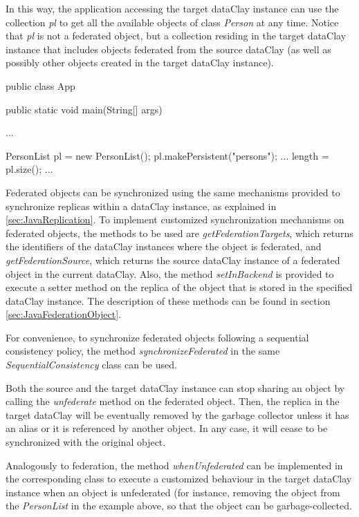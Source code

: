 In this way, the application accessing the target dataClay instance can use the collection \textit{pl} to get all the available objects of class \textit{Person} at any time. Notice that \textit{pl} is not a federated object, but a collection residing in the target dataClay instance that includes objects federated from the source dataClay (as well as possibly other objects created in the target dataClay instance).

\begin{tBox}
\begin{java}
public class App {
  public static void main(String[] args) {
    ...
    
    PersonList pl = new PersonList();
    pl.makePersistent("persons");
    ...
    length = pl.size();
    ...
  }
}
\end{java}
\end{tBox}
 
Federated objects can be synchronized using the same mechanisms provided to synchronize replicas within a dataClay instance, as explained in \ref{sec:JavaReplication}. To implement customized synchronization mechanisms on federated objects, the methods to be used are \textit{getFederationTargets}, which returns the identifiers of the dataClay instances where the object is federated, and \textit{getFederationSource}, which returns the source dataClay instance of a federated object in the current dataClay. Also, the method \textit{setInBackend} is provided to execute a setter method on the replica of the object that is stored in the specified dataClay instance. The description of these methods can be found in section \ref{sec:JavaFederationObject}.

For convenience, to synchronize federated objects following a sequential consistency policy, the method \textit{synchronizeFederated} in the same \textit{SequentialConsistency} class can be used.

Both the source and the target dataClay instance can stop sharing an object by calling the \textit{unfederate} method on the federated object. Then, the replica in the target dataClay will be eventually removed by the garbage collector unless it has an alias or it is referenced by another object. In any case, it will cease to be synchronized with the original object. 

Analogously to federation, the method \textit{whenUnfederated} can be implemented in the corresponding class to execute a customized behaviour in the target dataClay instance when an object is unfederated (for instance, removing the object from the \textit{PersonList} in the example above, so that the object can be garbage-collected.

\FEDERATION{

}